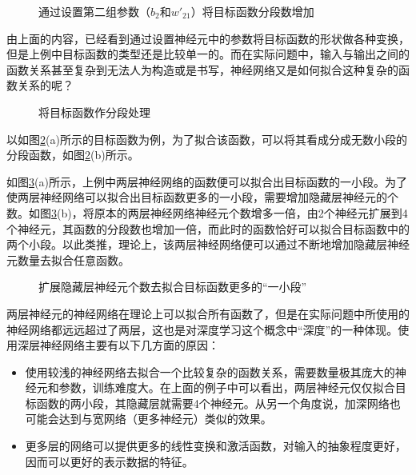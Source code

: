 \begin{figure}[htp]
\centering

\caption{通过设置第二组参数（$b_2$和$w'_{21}$）将目标函数分段数增加}
\label{fig:9-22}
\end {figure}

\parinterval 由上面的内容，已经看到通过设置神经元中的参数将目标函数的形状做各种变换，但是上例中目标函数的类型还是比较单一的。而在实际问题中，输入与输出之间的函数关系甚至复杂到无法人为构造或是书写，神经网络又是如何拟合这种复杂的函数关系的呢？

\begin{figure}[htp]
\centering

\caption{将目标函数作分段处理}
\label{fig:9-23}
\end {figure}

\parinterval 以如图\ref{fig:9-23}(a)所示的目标函数为例，为了拟合该函数，可以将其看成分成无数小段的分段函数，如图\ref{fig:9-23}(b)所示。

\parinterval 如图\ref{fig:9-24}(a)所示，上例中两层神经网络的函数便可以拟合出目标函数的一小段。为了使两层神经网络可以拟合出目标函数更多的一小段，需要增加隐藏层神经元的个数。如图\ref{fig:9-24}(b)，将原本的两层神经网络神经元个数增多一倍，由2个神经元扩展到4个神经元，其函数的分段数也增加一倍，而此时的函数恰好可以拟合目标函数中的两个小段。以此类推，理论上，该两层神经网络便可以通过不断地增加隐藏层神经元数量去拟合任意函数。

\begin{figure}[htp]
\centering

\caption{扩展隐藏层神经元个数去拟合目标函数更多的“一小段”}
\label{fig:9-24}
\end {figure}

\parinterval 两层神经元的神经网络在理论上可以拟合所有函数了，但是在实际问题中所使用的神经网络都远远超过了两层，这也是对深度学习这个概念中“深度”的一种体现。使用深层神经网络主要有以下几方面的原因：

\begin{itemize}
\vspace{0.5em}
\item 使用较浅的神经网络去拟合一个比较复杂的函数关系，需要数量极其庞大的神经元和参数，训练难度大。在上面的例子中可以看出，两层神经元仅仅拟合目标函数的两小段，其隐藏层就需要4个神经元。从另一个角度说，加深网络也可能会达到与宽网络（更多神经元）类似的效果。
\vspace{0.5em}
\item 更多层的网络可以提供更多的线性变换和激活函数，对输入的抽象程度更好，因而可以更好的表示数据的特征。
\vspace{0.5em}
\end{itemize}

